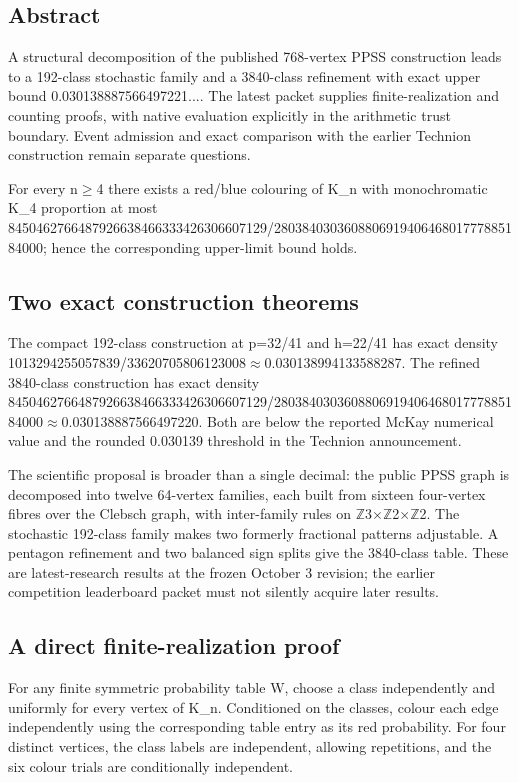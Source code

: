\documentclass[11pt,a4paper]{article}
\begin{document}
\subsection{Abstract}
A structural decomposition of the published 768-vertex PPSS construction leads to a 192-class stochastic family and a 3840-class refinement with exact upper bound 0.030138887566497221.... The latest packet supplies finite-realization and counting proofs, with native evaluation explicitly in the arithmetic trust boundary. Event admission and exact comparison with the earlier Technion construction remain separate questions.

For every n\ensuremath{\geq}4 there exists a red/blue colouring of K\_n with monochromatic K\_4 proportion at most 8450462766487926638466333426306607129/280384030360880691940646801777885184000; hence the corresponding upper-limit bound holds.

\subsection{Two exact construction theorems}
The compact 192-class construction at p=32/41 and h=22/41 has exact density 1013294255057839/33620705806123008\ensuremath{\approx}0.030138994133588287. The refined 3840-class construction has exact density 8450462766487926638466333426306607129/280384030360880691940646801777885184000\ensuremath{\approx}0.030138887566497220. Both are below the reported McKay numerical value and the rounded 0.030139 threshold in the Technion announcement.

The scientific proposal is broader than a single decimal: the public PPSS graph is decomposed into twelve 64-vertex families, each built from sixteen four-vertex fibres over the Clebsch graph, with inter-family rules on \ensuremath{\mathbb{Z}}3\ensuremath{\times}\ensuremath{\mathbb{Z}}2\ensuremath{\times}\ensuremath{\mathbb{Z}}2. The stochastic 192-class family makes two formerly fractional patterns adjustable. A pentagon refinement and two balanced sign splits give the 3840-class table. These are latest-research results at the frozen October 3 revision; the earlier competition leaderboard packet must not silently acquire later results.

\subsection{A direct finite-realization proof}
For any finite symmetric probability table W, choose a class independently and uniformly for every vertex of K\_n. Conditioned on the classes, colour each edge independently using the corresponding table entry as its red probability. For four distinct vertices, the class labels are independent, allowing repetitions, and the six colour trials are conditionally independent.
\end{document}
